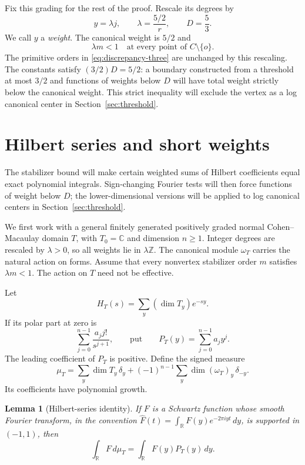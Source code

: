 \documentclass[11pt]{article}
\newtheorem{lemma}[theorem]{Lemma}
\theoremstyle{definition}
\theoremstyle{remark}
\numberwithin{equation}{section}
\newcommand{\C}{\mathbb C}
\newcommand{\R}{\mathbb R}
\newcommand{\Z}{\mathbb Z}
\newcommand{\dd}{\,d}
\begin{document}
Fix this grading for the rest of the proof. Rescale its degrees by
\begin{equation}\label{eq:rescale}
y=\lambda j,\qquad \lambda=\frac{5/2}{r},\qquad D=\frac53.
\end{equation}
We call \(y\) a \emph{weight}. The canonical weight is \(5/2\) and
\begin{equation}\label{eq:spectral-assumption}
\lambda m<1\quad\text{at every point of }C\setminus\{o\}.
\end{equation}
The primitive orders in \eqref{eq:discrepancy-three} are unchanged by this rescaling. The constants satisfy \((3/2)D=5/2\): a boundary constructed from a threshold at most \(3/2\) and functions of weights below \(D\) will have total weight strictly below the canonical weight. This strict inequality will exclude the vertex as a log canonical center in Section~\ref{sec:threshold}.

\section{Hilbert series and short weights}\label{sec:hilbert}

The stabilizer bound will make certain weighted sums of Hilbert coefficients equal exact polynomial integrals. Sign-changing Fourier tests will then force functions of weight below \(D\); the lower-dimensional versions will be applied to log canonical centers in Section~\ref{sec:threshold}.

We first work with a general finitely generated positively graded normal Cohen--Macaulay domain \(T\), with \(T_0=\C\) and dimension \(n\ge1\). Integer degrees are rescaled by \(\lambda>0\), so all weights lie in \(\lambda\Z\). The canonical module \(\omega_T\) carries the natural action on forms. Assume that every nonvertex stabilizer order \(m\) satisfies \(\lambda m<1\). The action on \(T\) need not be effective.

Let
\[
H_T(s)=\sum_y(\dim T_y)e^{-sy}.
\]
If its polar part at zero is
\[
\sum_{j=0}^{n-1}\frac{a_jj!}{s^{j+1}},
\qquad\text{put}\qquad
P_T(y)=\sum_{j=0}^{n-1}a_jy^j.
\]
The leading coefficient of \(P_T\) is positive. Define the signed measure
\begin{equation}\label{eq:measure}
\mu_T=\sum_y\dim T_y\,\delta_y
+(-1)^{n-1}\sum_y\dim(\omega_T)_y\,\delta_{-y}.
\end{equation}
Its coefficients have polynomial growth.

\begin{lemma}[Hilbert-series identity]\label{lem:hilbert}
If \(F\) is a Schwartz function whose smooth Fourier transform, in the convention
\(\widehat F(t)=\int_\R F(y)e^{-2\pi iyt}\dd y\), is supported in \((-1,1)\), then
\begin{equation}\label{eq:hilbert-identity}
\int_\R F\dd\mu_T=\int_\R F(y)P_T(y)\dd y.
\end{equation}
\end{lemma}
\end{document}
